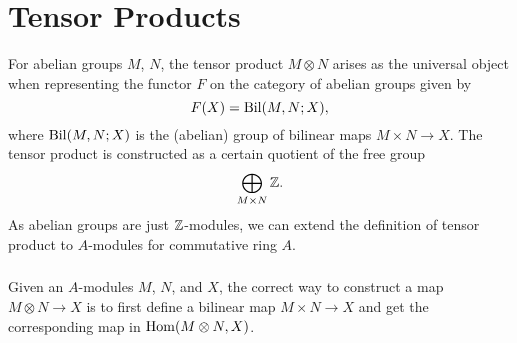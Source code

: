 \section{Tensor Products}
For abelian groups $M$, $N$, the tensor product $M \otimes N$ arises as the universal object when representing the functor $F$ on the category of abelian groups given by
\[
    F(X) = \operatorname{Bil}(M, N; X),
\]
where $\operatorname{Bil}(M, N; X)$ is the (abelian) group of bilinear maps $M \times N \rightarrow X$. The tensor product is constructed as a certain quotient of the free group
\[
    \bigoplus_{M \times N} {\mathbb Z}.
\]
As abelian groups are just ${\mathbb Z}$-modules, we can extend the definition of tensor product to $A$-modules for commutative ring $A$.

\subsubsection{}
Given an $A$-modules $M$, $N$, and $X$, the correct way to construct a map $M \otimes N \rightarrow X$ is to first define a bilinear map $M \times N \rightarrow X$ and get the corresponding map in $\operatorname{Hom}(M \otimes N, X)$.
